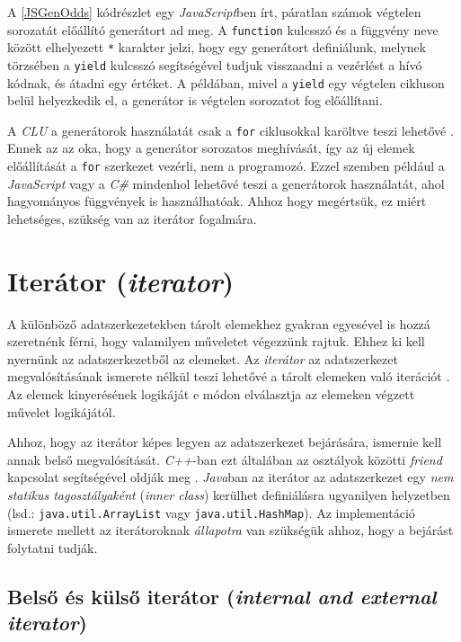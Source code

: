 A \ref{JSGenOdds} kódrészlet egy \textit{JavaScript}ben írt, páratlan számok végtelen sorozatát előállító generátort ad meg. A \texttt{function} kulcsszó és a függvény neve között elhelyezett \texttt{*} karakter jelzi, hogy egy generátort definiálunk, melynek törzsében a \texttt{yield} kulcsszó segítségével tudjuk visszaadni a vezérlést a hívó kódnak, és átadni egy értéket. A példában, mivel a \texttt{yield} egy végtelen cikluson belül helyezkedik el, a generátor is végtelen sorozatot fog előállítani.

A \textit{CLU} a generátorok használatát csak a \texttt{for} ciklusokkal karöltve teszi lehetővé \cite{CLUManual}. Ennek az az oka, hogy a generátor sorozatos meghívását, így az új elemek előállítását a \texttt{for} szerkezet vezérli, nem a programozó. Ezzel szemben például a \textit{JavaScript} vagy a \textit{C\#} mindenhol lehetővé teszi a generátorok használatát, ahol hagyományos függvények is használhatóak. Ahhoz hogy megértsük, ez miért lehetséges, szükség van az iterátor fogalmára.

\section{Iterátor (\textit{iterator})}

A különböző adatszerkezetekben tárolt elemekhez gyakran egyesével is hozzá szeretnénk férni, hogy valamilyen műveletet végezzünk rajtuk. Ehhez ki kell nyernünk az adatszerkezetből az elemeket. Az \textit{iterátor} az adatszerkezet megvalósításának ismerete nélkül teszi lehetővé a tárolt elemeken való iterációt \cite{Baker1992}. Az elemek kinyerésének logikáját e módon elválasztja az elemeken végzett művelet logikájától.

Ahhoz, hogy az iterátor képes legyen az adatszerkezet bejárására, ismernie kell annak belső megvalósítását. \textit{C++}-ban ezt általában az osztályok közötti \textit{friend} kapcsolat segítségével oldják meg . \textit{Java}ban az iterátor az adatszerkezet egy \textit{nem statikus tagosztályaként} (\textit{inner class}) kerülhet definiálásra ugyanilyen helyzetben (lsd.: \texttt{java.util.ArrayList} vagy \texttt{java.util.HashMap}). Az implementáció ismerete mellett az iterátoroknak \textit{állapotra} van szükségük ahhoz, hogy a bejárást folytatni tudják. 

\subsection{Belső és külső iterátor (\textit{internal and external iterator})}

